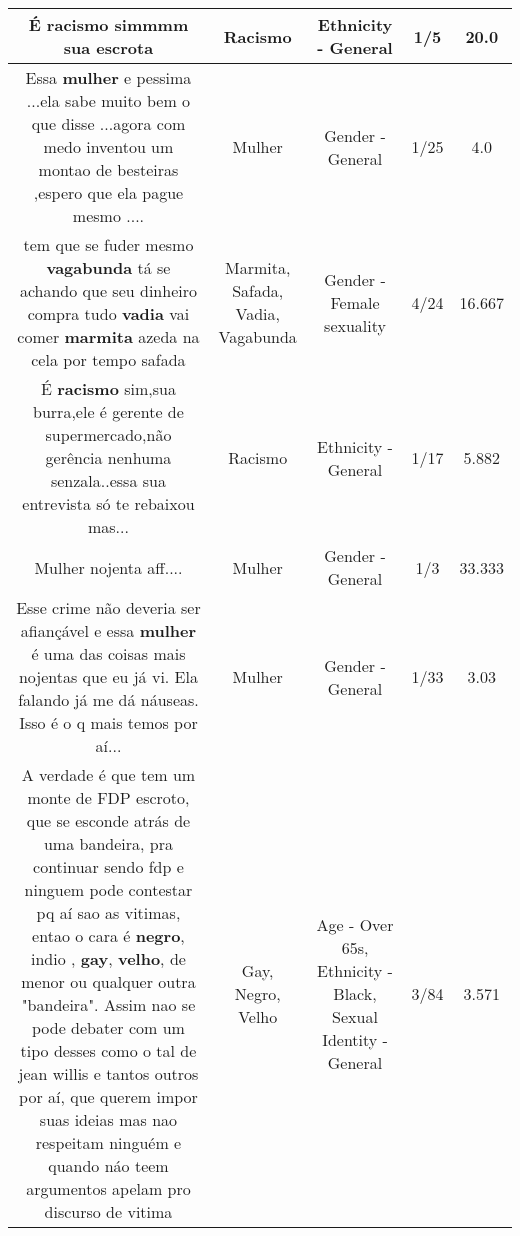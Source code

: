 \documentclass[11pt]{article}
\newlength\mylength
\begin{document}
\begin{center}
\begin{longtable}{|C{.65\mylength}|C{.30\mylength}|C{.12\mylength}|C{.12\mylength}|C{.12\mylength}|}
  \small É \textbf{racismo} simmmm sua escrota\normalsize   & Racismo & Ethnicity - General & 1/5 & 20.0 \\  \hline
  \small Essa \textbf{mulher} e pessima ...ela sabe muito bem o que disse ...agora com medo inventou um montao de besteiras ,espero que ela pague mesmo ....\normalsize   & Mulher & Gender - General & 1/25 & 4.0 \\  \hline
  \small tem que se fuder mesmo \textbf{vagabunda} tá se achando que seu dinheiro compra tudo \textbf{vadia} vai comer \textbf{marmita} azeda na cela por tempo safada\normalsize   & Marmita, Safada, Vadia, Vagabunda & Gender - Female sexuality & 4/24 & 16.667 \\  \hline
  \small É \textbf{racismo} sim,sua burra,ele é gerente de supermercado,não gerência nenhuma senzala..essa sua entrevista só te rebaixou mas...\normalsize   & Racismo & Ethnicity - General & 1/17 & 5.882 \\  \hline
  \small Mulher nojenta aff....\normalsize   & Mulher & Gender - General & 1/3 & 33.333 \\  \hline
  \small Esse crime não deveria ser afiançável e essa \textbf{mulher} é uma das coisas mais nojentas que eu já vi. Ela falando já me dá náuseas. Isso é o q mais temos por aí...\normalsize   & Mulher & Gender - General & 1/33 & 3.03 \\  \hline
  \small A verdade é que tem um monte de FDP escroto, que se esconde atrás de uma bandeira, pra continuar sendo fdp e ninguem pode contestar pq aí sao as vitimas, entao o cara é \textbf{negro}, indio , \textbf{gay}, \textbf{velho}, de menor ou qualquer outra "bandeira". Assim nao se pode debater com um tipo desses  como o tal de jean willis e tantos outros por aí, que querem impor suas ideias mas nao respeitam ninguém e quando náo teem argumentos apelam pro discurso de vitima\normalsize   & Gay, Negro, Velho & Age - Over 65s, Ethnicity - Black, Sexual Identity - General & 3/84 & 3.571 \\  \hline

\end{longtable}
\end{center}
\end{document}
